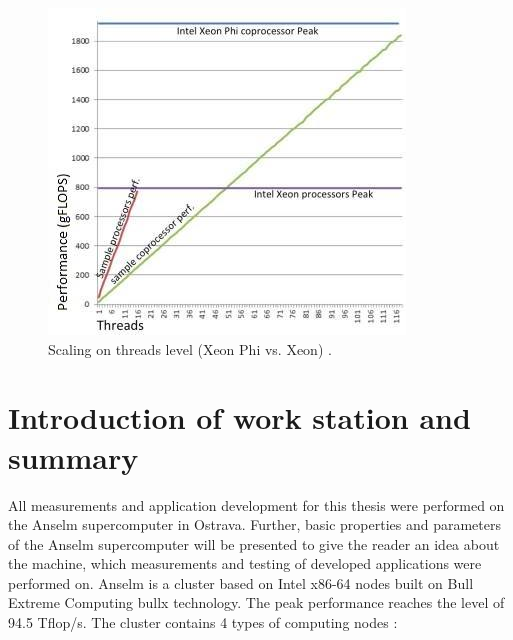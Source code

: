 \begin{figure}[htb]
    \centering
    \includegraphics[width=0.7\linewidth]{fig/phi_scaling.jpg}
    \caption{Scaling on threads level (Xeon Phi vs. Xeon) \cite{xeon_phi_book}.}
    \label{fig:phi_scaling}
\end{figure} 

\section{Introduction of work station and summary}
All measurements and application development for this thesis were performed on the Anselm supercomputer in Ostrava. Further, basic properties and parameters of the Anselm supercomputer will be presented to give the reader an idea about the machine, which measurements and testing of developed applications were performed on. Anselm is a cluster based on Intel x86-64 nodes built on Bull Extreme Computing bullx technology. The peak performance reaches the level of 94.5 Tflop/s. The cluster contains 4 types of computing nodes \cite{anselm_guide}:

